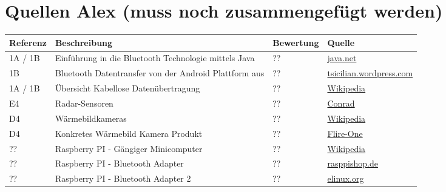 \section{Quellen Alex (muss noch zusammengefügt werden)}

\begin{table}[h!]
	\centering
	\begin{tabular}{l l l l}
		Referenz & Beschreibung & Bewertung & Quelle \\
		\hline
        
        1A / 1B & Einführung in die Bluetooth Technologie mittels Java & ?? & \href{https://today.java.net/pub/a/today/2004/07/27/bluetooth.html}{java.net} \\
        
        1B & Bluetooth Datentransfer von der Android Plattform aus & ?? & \href{http://tsicilian.wordpress.com/2012/11/06/bluetooth-data-transfer-with-android/}{tsicilian.wordpress.com} \\
        
        1A / 1B & Übersicht Kabellose Datenübertragung & ?? & \href{http://de.wikipedia.org/w/index.php?title=Kabellose_\%C3\%9Cbertragungsverfahren&redirect=no}{Wikipedia} \\
        
        E4 & Radar-Sensoren & ?? & \href{http://www.conrad.ch/ce/de/overview/0231510/Radar-Sensoren}{Conrad} \\
        
        D4 & Wärmebildkameras & ?? & \href{http://de.wikipedia.org/wiki/W\%C3\%A4rmebildkamera}{Wikipedia} \\
        
        D4 & Konkretes Wärmebild Kamera Produkt & ?? & \href{http://www.mobilefun.co.uk/flir-one-personal-thermal-imaging-case-for-iphone-5-5s-p43472.htm}{Flire-One} \\
        
        ?? & Raspberry PI - Gängiger Minicomputer & ?? & \href{http://de.wikipedia.org/wiki/Raspberry_Pi}{Wikipedia} \\
        
        ?? & Raspberry PI - Bluetooth Adapter & ?? & \href{http://www.rasppishop.de/raspberry-pi-welt/netzwerk/w-lan/149/bluetooth-dongle-v2.0-adapter-fuer-raspberry-pi}{rasppishop.de} \\
        
        ?? & Raspberry PI - Bluetooth Adapter 2 & ?? & \href{http://elinux.org/RPi_USB_Bluetooth_adapters}{elinux.org} \\
        

\end{tabular}
\end{table}
